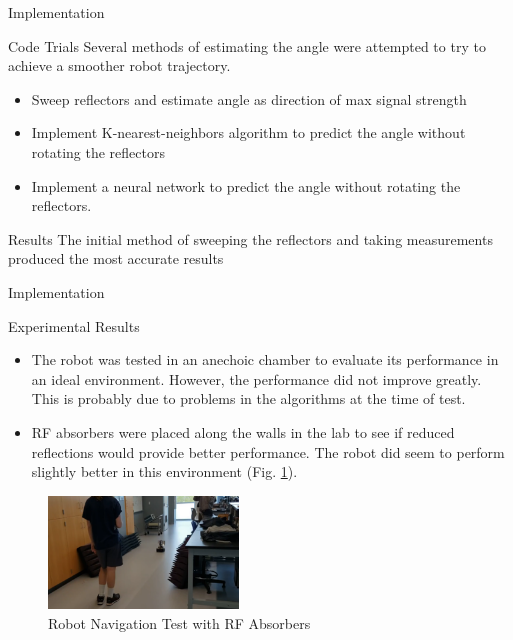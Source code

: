 \documentclass{beamer}
\begin{document}
\begin{frame}{Implementation}
\begin{block}{Code Trials}
Several methods of estimating the angle were attempted to try to achieve a smoother robot trajectory.
    \begin{itemize}
      \item Sweep reflectors and estimate angle as direction of max signal strength
      \item Implement K-nearest-neighbors algorithm to predict the angle without rotating the reflectors
      \item Implement a neural network to predict the angle without rotating the reflectors.
    \end{itemize}
  \end{block}
  \begin{block}{Results}
    The initial method of sweeping the reflectors and taking measurements produced the most accurate results
  \end{block}
\end{frame}

\begin{frame}{Implementation}
\begin{block}{Experimental Results}
    \begin{itemize}
      \item The robot was tested in an anechoic chamber to evaluate its performance in an ideal environment. However, the performance did not improve greatly. This is probably due to problems in the algorithms at the time of test.
      \item RF absorbers were placed along the walls in the lab to see if reduced reflections would provide better performance. The robot did seem to perform slightly better in this environment (Fig. \ref{fig:AbsorberTest}).
    \end{itemize}
  \end{block}
    \begin{figure}
      \centering
      \includegraphics[height=3cm]{figs/img/Absorber_test.png}
      \caption{Robot Navigation Test with RF Absorbers}
      \label{fig:AbsorberTest}
    \end{figure}
\end{frame}
\end{document}
